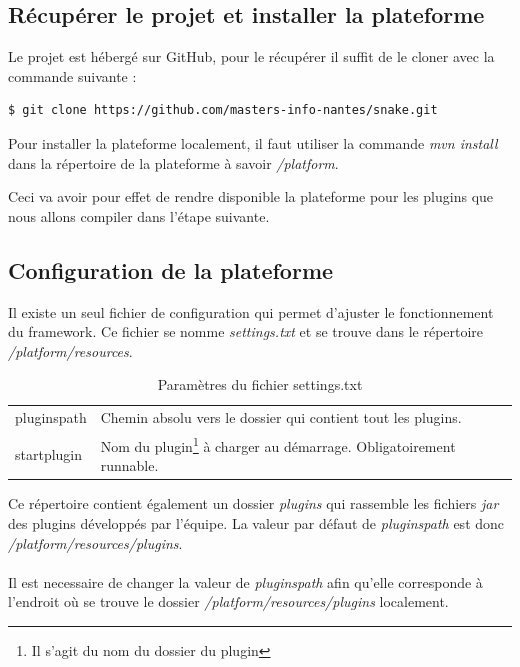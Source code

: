 \documentclass[12pt,a4paper]{article}
\begin{document}
\subsection{Récupérer le projet et installer la plateforme}
Le projet est hébergé sur GitHub, pour le récupérer il suffit de le cloner avec
la commande suivante :

\begin{lstlisting}[language=bash,caption=Télécharger le projet]
$ git clone https://github.com/masters-info-nantes/snake.git
\end{lstlisting}

Pour installer la plateforme localement, il faut utiliser la commande 
\og{}\emph{mvn install}\fg{} dans la répertoire de la plateforme à savoir 
\emph{/platform}.

Ceci va avoir pour effet de rendre disponible la plateforme pour les plugins 
que nous allons compiler dans l'étape suivante.

\subsection{Configuration de la plateforme}
Il existe un seul fichier de configuration qui permet d'ajuster le fonctionnement 
du framework. Ce fichier se nomme \emph{settings.txt} et se trouve dans le 
répertoire \emph{/platform/resources}.

\begin{table}[h]
\centering
	\begin{tabular}{lp{9cm}}
		pluginspath & Chemin absolu vers le dossier qui contient tout les plugins.\\
					 
		startplugin & Nom du plugin\footnote{Il s'agit du nom du dossier du 
		plugin} à charger au démarrage. Obligatoirement runnable.\\					 
	\end{tabular}	
\caption{Paramètres du fichier settings.txt}
\end{table}
	
Ce répertoire contient également un dossier \emph{plugins} qui rassemble les fichiers 
\emph{jar} des plugins développés par l'équipe. La valeur par défaut de 
\emph{pluginspath} est donc \emph{/platform/resources/plugins}.
\\\\
Il est necessaire de changer la valeur de \emph{pluginspath} afin qu'elle corresponde 
à l'endroit où se trouve le dossier \emph{/platform/resources/plugins} localement.
\end{document}
